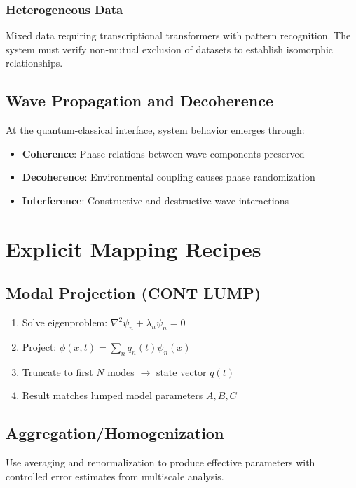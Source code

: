 \documentclass[11pt,a4paper]{article}
\begin{document}
\subsubsection{Heterogeneous Data}
Mixed data requiring transcriptional transformers with pattern recognition. The system must verify non-mutual exclusion of datasets to establish isomorphic relationships.

\subsection{Wave Propagation and Decoherence}

At the quantum-classical interface, system behavior emerges through:
\begin{itemize}
    \item \textbf{Coherence}: Phase relations between wave components preserved
    \item \textbf{Decoherence}: Environmental coupling causes phase randomization
    \item \textbf{Interference}: Constructive and destructive wave interactions
\end{itemize}

\section{Explicit Mapping Recipes}
\label{sec:mappings}

\subsection{Modal Projection (CONT \textrightarrow{} LUMP)}
\begin{enumerate}
    \item Solve eigenproblem: $\nabla^2 \psi_n + \lambda_n \psi_n = 0$
    \item Project: $\phi(x,t) = \sum_n q_n(t)\psi_n(x)$
    \item Truncate to first $N$ modes $\to$ state vector $q(t)$
    \item Result matches lumped model parameters $A, B, C$
\end{enumerate}

\subsection{Aggregation/Homogenization}
Use averaging and renormalization to produce effective parameters with controlled error estimates from multiscale analysis.
\end{document}
